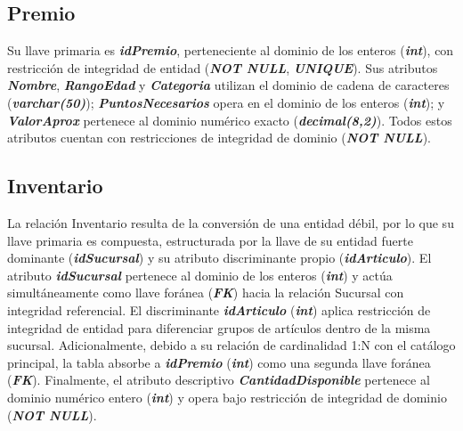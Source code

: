 \documentclass[11pt,letterpaper,spanish]{article}
\begin{document}
\subsection{Premio}
Su llave primaria es \textbf{\textit{idPremio}}, perteneciente al dominio de los enteros (\textbf{\textit{int}}), con restricción de integridad de entidad (\textbf{\textit{NOT NULL}}, \textbf{\textit{UNIQUE}}). Sus atributos \textbf{\textit{Nombre}}, \textbf{\textit{RangoEdad}} y \textbf{\textit{Categoria}} utilizan el dominio de cadena de caracteres (\textbf{\textit{varchar(50)}}); \textbf{\textit{PuntosNecesarios}} opera en el dominio de los enteros (\textbf{\textit{int}}); y \textbf{\textit{ValorAprox}} pertenece al dominio numérico exacto (\textbf{\textit{decimal(8,2)}}). Todos estos atributos cuentan con restricciones de integridad de dominio (\textbf{\textit{NOT NULL}}).

\subsection{Inventario}
La relación Inventario resulta de la conversión de una entidad débil, por lo que su llave primaria es compuesta, estructurada por la llave de su entidad fuerte dominante (\textbf{\textit{idSucursal}}) y su atributo discriminante propio (\textbf{\textit{idArticulo}}). El atributo \textbf{\textit{idSucursal}} pertenece al dominio de los enteros (\textbf{\textit{int}}) y actúa simultáneamente como llave foránea (\textbf{\textit{FK}}) hacia la relación Sucursal con integridad referencial. El discriminante \textbf{\textit{idArticulo}} (\textbf{\textit{int}}) aplica restricción de integridad de entidad para diferenciar grupos de artículos dentro de la misma sucursal. Adicionalmente, debido a su relación de cardinalidad 1:N con el catálogo principal, la tabla absorbe a \textbf{\textit{idPremio}} (\textbf{\textit{int}}) como una segunda llave foránea (\textbf{\textit{FK}}). Finalmente, el atributo descriptivo \textbf{\textit{CantidadDisponible}} pertenece al dominio numérico entero (\textbf{\textit{int}}) y opera bajo restricción de integridad de dominio (\textbf{\textit{NOT NULL}}).
\end{document}
